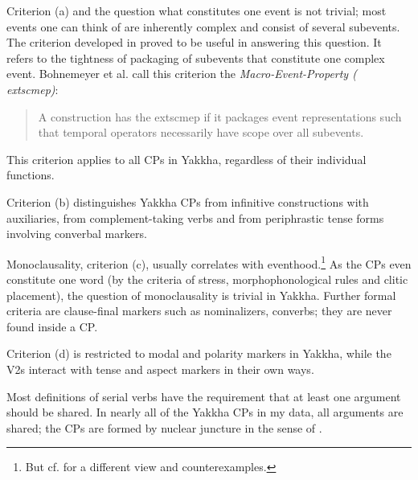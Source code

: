 Criterion (a) and the question what constitutes one event is not trivial; most events one can think of are inherently complex and consist of several subevents. The criterion developed in \citet{Bohnemeyeretal2007_Principles} proved to be  useful in answering this question. It refers to the tightness of packaging of subevents that constitute one complex event. Bohnemeyer et al. call this criterion the \emph{Macro-Event-Property (	extsc{mep})}: 
\begin{quote}
A construction has the 	extsc{mep} if it packages event representations such that temporal operators necessarily have scope over all subevents. \citep[504--5]{Bohnemeyeretal2007_Principles}
\end{quote}

This criterion applies to all CPs in Yakkha, regardless of their individual functions. 

Criterion (b) distinguishes Yakkha CPs from infinitive constructions with auxiliaries, from complement-taking verbs and from periphrastic tense forms involving converbal markers. 

Monoclausality, criterion (c), usually correlates with eventhood.\footnote{But cf. \citet{Foley2010_Events} for a different view and counterexamples.} As the CPs even constitute one word (by the criteria of stress, morphophonological rules and clitic placement), the question of monoclausality is trivial in Yakkha. Further formal criteria are clause-final markers such as  nominalizers, converbs; they are never found inside a CP.  

Criterion (d) is restricted to modal and polarity markers in Yakkha, while the V2s interact with tense and aspect markers in their own ways. 

Most definitions of serial verbs have the requirement that at least one argument should be shared. In nearly all of the Yakkha CPs in my data, all arguments are shared; the CPs are formed by nuclear juncture in the sense of \citet[190]{Foleyetal1984Functional}. 

